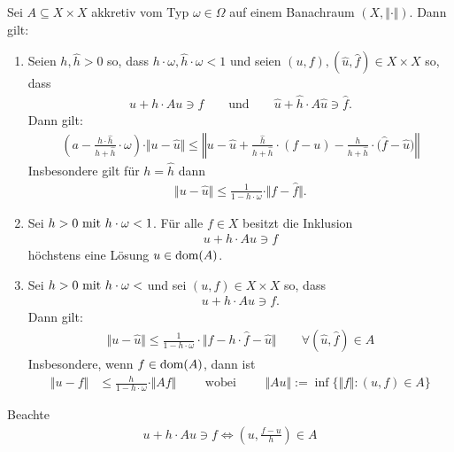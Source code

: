 \begin{theorem}\enter
Sei $A\subseteq X\times X$ akkretiv vom Typ $\omega\in\Omega$ auf einem Banachraum $(X,\Vert\cdot\Vert)$. Dann gilt:
\begin{enumerate}[label=(\alph*)]
\item Seien $h,\hat{h}>0$ so, dass $h\cdot\omega,\hat{h}\cdot\omega<1$ und seien $(u,f),(\hat{u},\hat{f})\in X\times X$ so, dass 
\begin{align*}
u+h\cdot Au\ni f\qquad\text{und}\qquad\hat{u}+\hat{h}\cdot A\hat{u}\ni\hat{f}.
\end{align*}
Dann gilt:
\begin{align*}
\left(a-\frac{h\cdot\hat{h}}{h+\hat{h}}\cdot\omega\right)\cdot\Vert u-\hat{u}\Vert
\leq
\left\Vert u-\hat{u}+\frac{\hat{h}}{h+\hat{h}}\cdot(f-u)-\frac{h}{h+\hat{h}}\cdot\big(\hat{f}-\hat{u}\big)\right\Vert
\end{align*}
Insbesondere gilt für $h=\hat{h}$ dann
\begin{align*}
\Vert u-\hat{u}\Vert
\leq
\frac{1}{1-h\cdot\omega}\cdot\Vert f-\hat{f}\Vert.
\end{align*}
\item Sei $h>0\mit h\cdot \omega<1$. Für alle $f\in X$ besitzt die Inklusion
\begin{align*}
u+h\cdot Au\ni f
\end{align*}
höchstens eine Lösung $u\in\dom(A)$.
\item Sei $h>0\mit h\cdot\omega<$ und sei $(u,f)\in X\times X$ so, dass 
\begin{align*}
u+h\cdot Au\ni f.
\end{align*}
Dann gilt:
\begin{align*}
\Vert u-\hat{u}\Vert
\leq
\frac{1}{1-h\cdot\omega}\cdot\big\Vert f-h\cdot\hat{f}-\hat{u}\big\Vert
\qquad
\forall(\hat{u},\hat{f})\in A
\end{align*}
Insbesondere, wenn $f\in\dom(A)$, dann ist
\begin{align*}
\Vert u-f\Vert
&\leq
\frac{h}{1-h\cdot\omega}\cdot\Vert Af\Vert
\qquad
\text{ wobei }
\qquad
\Vert Au\Vert:=\inf\big\lbrace\Vert f\Vert:(u,f)\in A\big\rbrace
\end{align*}
\end{enumerate}
\end{theorem}

\begin{bemerkung}
Beachte
\begin{align*}
u+h\cdot Au\ni f\Longleftrightarrow\left(u,\frac{f-u}{h}\right)\in A
\end{align*}
\end{bemerkung}

